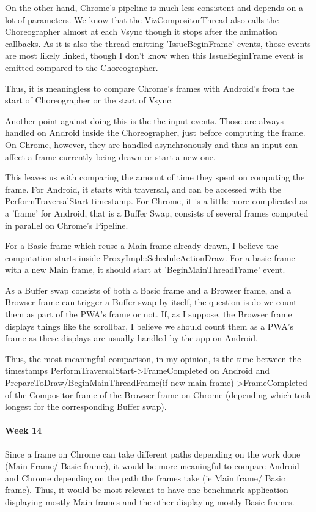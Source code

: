 \documentclass{kththesis}
\begin{document}
On the other hand, Chrome's pipeline is much less consistent and depends on a lot of parameters. We know that the VizCompositorThread also calls the Choreographer almost at each Vsync though it stops after the animation callbacks. As it is also the thread emitting 'IssueBeginFrame' events, those events are most likely linked, though I don't know when this IssueBeginFrame event is emitted compared to the Choreographer.

Thus, it is meaningless to compare Chrome's frames with Android's from the start of Choreographer or the start of Vsync.

Another point against doing this is the the input events. Those are always handled on Android inside the Choreographer, just before computing the frame. On Chrome, however, they are handled asynchronously and thus an input can affect a frame currently being drawn or start a new one.

This leaves us with comparing the amount of time they spent on computing the frame. For Android, it starts with traversal, and can be accessed with the PerformTraversalStart timestamp. For Chrome, it is a little more complicated as a 'frame' for Android, that is a Buffer Swap, consists of several frames computed in parallel on Chrome's Pipeline.

For a Basic frame which reuse a Main frame already drawn, I believe the computation starts inside ProxyImpl::ScheduleActionDraw. For a basic frame with a new Main frame, it should start at 'BeginMainThreadFrame' event. 

As a Buffer swap consists of both a Basic frame and a Browser frame, and a Browser frame can trigger a Buffer swap by itself, the question is do we count them as part of the PWA's frame or not. If, as I suppose, the Browser frame displays things like the scrollbar, I believe we should count them as a PWA's frame as these displays are usually handled by the app on Android. 

Thus, the most meaningful comparison, in my opinion, is the time between the timestamps PerformTraversalStart->FrameCompleted on Android and PrepareToDraw/BeginMainThreadFrame(if new main frame)->FrameCompleted of the Compositor frame of the Browser frame on Chrome (depending which took longest for the corresponding Buffer swap).

\paragraph{Week 14}
Since a frame on Chrome can take different paths depending on the work done (Main Frame/ Basic frame), it would be more meaningful to compare Android and Chrome depending on the path the frames take (ie Main frame/ Basic frame). Thus, it would be most relevant to have one benchmark application displaying mostly Main frames and the other displaying mostly Basic frames.
\end{document}
